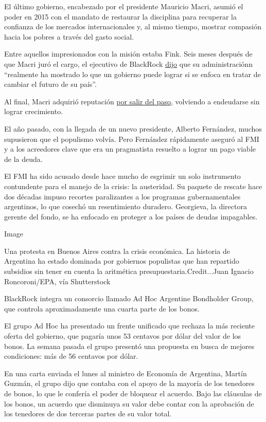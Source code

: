 El último gobierno, encabezado por el presidente Mauricio Macri, asumió
el poder en 2015 con el mandato de restaurar la disciplina para
recuperar la confianza de los mercados internacionales y, al mismo
tiempo, mostrar compasión hacia los pobres a través del gasto social.

Entre aquellos impresionados con la misión estaba Fink. Seis meses
después de que Macri juró el cargo, el ejecutivo de BlackRock
\href{https://www.youtube.com/watch?v=TM_MC2Fj-JI}{dijo} que su
administraciónn ``realmente ha mostrado lo que un gobierno puede lograr
si se enfoca en tratar de cambiar el futuro de su país''.

Al final, Macri adquirió reputación
\href{https://www.nytimes3xbfgragh.onion/es/2019/05/14/espanol/america-latina/argentina-economia-macri-kirchnerismo.html}{por
salir del paso}, volviendo a endeudarse sin lograr crecimiento.

El año pasado, con la llegada de un nuevo presidente, Alberto Fernández,
muchos supusieron que el populismo volvía. Pero Fernández rápidamente
aseguró al FMI y a los acreedores clave que era un pragmatista resuelto
a lograr un pago viable de la deuda.

El FMI ha sido acusado desde hace mucho de esgrimir un solo instrumento
contundente para el manejo de la crisis: la austeridad. Su paquete de
rescate hace dos décadas impuso recortes paralizantes a los programas
gubernamentales argentinos, lo que cosechó un resentimiento duradero.
Georgieva, la directora gerente del fondo, se ha enfocado en proteger a
los países de deudas impagables.

Image

Una protesta en Buenos Aires contra la crisis económica. La historia de
Argentina ha estado dominada por gobiernos populistas que han repartido
subsidios sin tener en cuenta la aritmética presupuestaria.Credit...Juan
Ignacio Roncoroni/EPA, vía Shutterstock

BlackRock integra un consorcio llamado Ad Hoc Argentine Bondholder
Group, que controla aproximadamente una cuarta parte de los bonos.

El grupo Ad Hoc ha presentado un frente unificado que rechaza la más
reciente oferta del gobierno, que pagaría unos 53 centavos por dólar del
valor de los bonos. La semana pasada el grupo presentó una propuesta en
busca de mejores condiciones: más de 56 centavos por dólar.

En una carta enviada el lunes al ministro de Economía de Argentina,
Martín Guzmán, el grupo dijo que contaba con el apoyo de la mayoría de
los tenedores de bonos, lo que le confería el poder de bloquear el
acuerdo. Bajo las cláusulas de los bonos, un acuerdo que disminuya su
valor debe contar con la aprobación de los tenedores de dos terceras
partes de su valor total.

